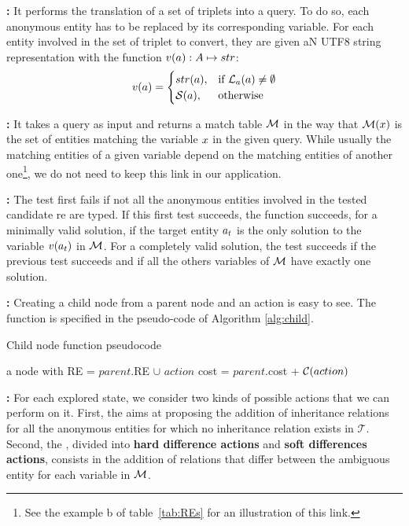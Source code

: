 \textbf{\toquery: }
It performs the translation of a set of triplets into a \sparql{} query. To do so, each anonymous entity has to be replaced by its corresponding variable. For each entity involved in the set of triplet to convert, they are given aN UTF8 string representation with the function $v(a): A \mapsto str$: 
\[ 
    v(a) = 
    \begin{cases}
        str(a),& \text{if } \mathcal{L}_a(a) \neq \emptyset\\
        \mathcal{S}(a),& \text{otherwise}
    \end{cases} 
\]

\textbf{\sparqlresult: }
It takes a \sparql{} query as input and returns a match table $\mathcal{M}$ in the way that $\mathcal{M}(x)$ is the set of entities matching the variable $x$ in the given query. While usually the matching entities of a given variable depend on the matching entities of another one\footnote{See the example b of table~\ref{tab:REs} for an illustration of this link.}, we do not need to keep this link in our application.

\textbf{\goaltest: }
The test first fails if not all the anonymous entities involved in the tested candidate \acrshort{re} are typed. If this first test succeeds, the function succeeds, for a minimally valid solution, if the target entity $a_t$ is the only solution to the variable $v(a_t)$ in $\mathcal{M}$. For a completely valid solution, the test succeeds if the previous test succeeds and if all the others variables of $\mathcal{M}$ have exactly one solution.

\textbf{\createchild: } 
Creating a child node from a parent node and an action is easy to see. The \createchild function is specified in the pseudo-code of Algorithm \ref{alg:child}. 

\begin{algorithm}[ht!]
\caption{\label{alg:child} Child node function pseudocode}
\begin{algorithmic}
    \State \Return a node with
    \State RE = $parent$.RE $\cup$ $action$
    \State cost = $parent$.cost + $\mathcal{C}(action)$
\EndFunction
\end{algorithmic}
\end{algorithm}

\textbf{\actions: }
For each explored state, we consider two kinds of possible actions that we can perform on it. First, the \typingactions{} aims at proposing the addition of inheritance relations for all the anonymous entities for which no inheritance relation exists in $\mathcal{T}$. Second, the \differenceactions{}, divided into \textbf{hard difference actions} and \textbf{soft differences actions}, consists in the addition of relations that differ between the ambiguous entity for each variable in $\mathcal{M}$.


